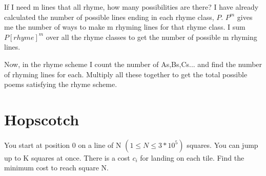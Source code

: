 \documentclass{article}
\begin{document}
    If I need m lines that all rhyme, how many possibilities are there? I have already calculated the number of possible lines ending in each rhyme class, $P$. $P^m$ gives me the number of ways to make m rhyming lines for that rhyme class. I sum $P[rhyme]^m$ over all the rhyme classes to get the number of possible m rhyming lines.
    
    Now, in the rhyme scheme I count the number of As,Bs,Cs... and find the number of rhyming lines for each. Multiply all these together to get the total possible poems satisfying the rhyme scheme.
    
\section{Hopscotch}
You start at position 0 on a line of N $(1\leq N \leq 3*10^5)$ squares. You can jump up to K squares at once. There is a cost $c_i$ for landing on each tile. Find the minimum cost to reach square N.
\end{document}
